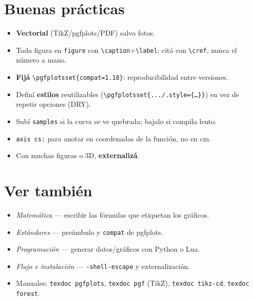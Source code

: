 \documentclass[11pt,a4paper]{article}
\newcommand{\C}[1]{\texttt{\textbackslash #1}}
\newcommand{\pkg}[1]{\textsf{#1}}
\begin{document}
\section{Buenas prácticas}
\begin{itemize}[noitemsep,leftmargin=*]
  \item \textbf{Vectorial} (TikZ/\pkg{pgfplots}/PDF) salvo fotos.
  \item Toda figura en \texttt{figure} con \C{caption}+\C{label}; citá con
        \C{cref}, nunca el número a mano.
  \item \textbf{Fijá} \texttt{\textbackslash pgfplotsset\{compat=1.18\}}:
        reproducibilidad entre versiones.
  \item Definí \textbf{estilos} reutilizables (\C{pgfplotsset\{.../.style=\{\dots\}\}})
        en vez de repetir opciones (DRY).
  \item Subí \texttt{samples} si la curva se ve quebrada; bajalo si compila lento.
  \item \texttt{axis cs:} para anotar en coordenadas de la función, no en cm.
  \item Con muchas figuras o 3D, \textbf{externalizá}.
\end{itemize}

\section*{Ver también}
\begin{itemize}[noitemsep,leftmargin=*]
  \item \emph{Matemática} — escribir las fórmulas que etiquetan los gráficos.
  \item \emph{Estándares} — preámbulo y \texttt{compat} de \pkg{pgfplots}.
  \item \emph{Programación} — generar datos/gráficos con Python o Lua.
  \item \emph{Flujo e instalación} — \texttt{-shell-escape} y externalización.
  \item Manuales: \texttt{texdoc pgfplots}, \texttt{texdoc pgf} (TikZ),
        \texttt{texdoc tikz-cd}, \texttt{texdoc forest}.
\end{itemize}
\end{document}
